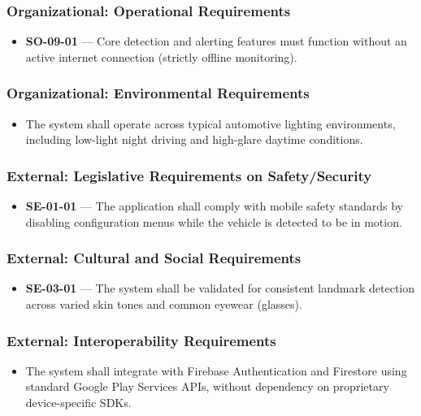 \documentclass[11pt]{report}
\begin{document}
\subsubsection{Organizational: Operational Requirements}
\begin{itemize}
    \item \textbf{SO-09-01} — Core detection and alerting features must function without an active internet connection (strictly offline monitoring).
\end{itemize}

\subsubsection{Organizational: Environmental Requirements}
\begin{itemize}
    \item The system shall operate across typical automotive lighting environments, including low-light night driving and high-glare daytime conditions.
\end{itemize}

\subsubsection{External: Legislative Requirements on Safety/Security}
\begin{itemize}
    \item \textbf{SE-01-01} — The application shall comply with mobile safety standards by disabling configuration menus while the vehicle is detected to be in motion.
\end{itemize}

\subsubsection{External: Cultural and Social Requirements}
\begin{itemize}
    \item \textbf{SE-03-01} — The system shall be validated for consistent landmark detection across varied skin tones and common eyewear (glasses).
\end{itemize}

\subsubsection{External: Interoperability Requirements}
\begin{itemize}
    \item The system shall integrate with Firebase Authentication and Firestore using standard Google Play Services APIs, without dependency on proprietary device-specific SDKs.
\end{itemize}
\end{document}
